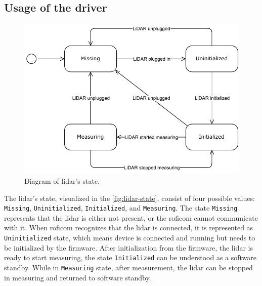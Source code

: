 \documentclass[
  digital,     %
  oneside,     %
  nosansbold,  %
  nocolorbold, %
  nolof,         %
  nolot,         %
]{fithesis4}
\begin{document}
{{{\subsection{ Usage of the driver }

\begin{figure}[h!]
    \includegraphics[width=\textwidth,height=\textheight,keepaspectratio]{assets/lidar-state.pdf}
    \caption[Diagram of \acrshort{lidar}'s state]{Diagram of \acrshort{lidar}'s state.}
    \label{fig:lidar-state}
\end{figure}

The \acrshort{lidar}'s state, visualized in the \autoref{fig:lidar-state}, consist of four possible values: \texttt{Missing}, \texttt{Uninitialized}, \texttt{Initialized}, and \texttt{Measuring}. The state \texttt{Missing} represents that the \acrshort{lidar} is either not present, or the \acrshort{roficom} cannot communicate with it. When \acrshort{roficom} recognizes that the \acrshort{lidar} is connected, it is represented as \texttt{Uninitialized} state, which means device is connected and running but needs to be initialized by the firmware. After initialization from the firmware, the \acrshort{lidar} is ready to start measuring, the state \texttt{Initialized} can be understood as a software standby. While in \texttt{Measuring} state, after measurement, the \acrshort{lidar} can be stopped in measuring and returned to software standby.

}}}
\end{document}
